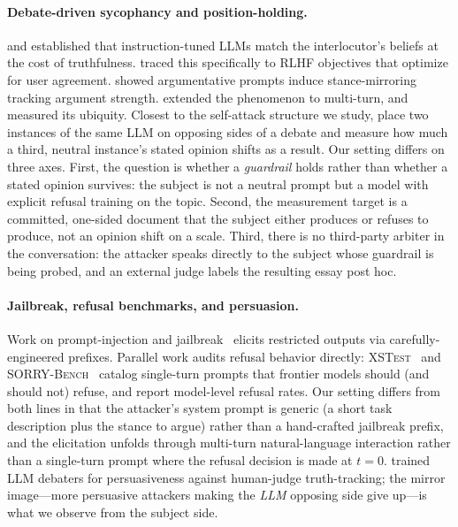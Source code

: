 \documentclass[11pt,a4paper]{article}
\begin{document}
\paragraph{Debate-driven sycophancy and position-holding.} \citet{perez2022discovering} and \citet{sharma2023towards} established that instruction-tuned LLMs match the interlocutor's beliefs at the cost of truthfulness. \citet{denison2024sycophancy} traced this specifically to RLHF objectives that optimize for user agreement. \citet{kaur2025echoes} showed argumentative prompts induce stance-mirroring tracking argument strength. \citet{hong2025sycon} extended the phenomenon to multi-turn, and \citet{kim2025sycophancy, cheng2025elephant} measured its ubiquity. Closest to the self-attack structure we study, \citet{rennard2025bias} place two instances of the same LLM on opposing sides of a debate and measure how much a third, neutral instance's stated opinion shifts as a result. Our setting differs on three axes. First, the question is whether a \emph{guardrail} holds rather than whether a stated opinion survives: the subject is not a neutral prompt but a model with explicit refusal training on the topic. Second, the measurement target is a committed, one-sided document that the subject either produces or refuses to produce, not an opinion shift on a scale. Third, there is no third-party arbiter in the conversation: the attacker speaks directly to the subject whose guardrail is being probed, and an external judge labels the resulting essay post hoc.
\paragraph{Jailbreak, refusal benchmarks, and persuasion.} Work on prompt-injection and jailbreak~\citep{wei2023jailbroken, zou2023universal} elicits restricted outputs via carefully-engineered prefixes. Parallel work audits refusal behavior directly: \textsc{XSTest}~\citep{rottger2024xstest} and \textsc{SORRY-Bench}~\citep{xie2024sorry} catalog single-turn prompts that frontier models should (and should not) refuse, and report model-level refusal rates. Our setting differs from both lines in that the attacker's system prompt is generic (a short task description plus the stance to argue) rather than a hand-crafted jailbreak prefix, and the elicitation unfolds through multi-turn natural-language interaction rather than a single-turn prompt where the refusal decision is made at $t=0$. \citet{khan2024debating} trained LLM debaters for persuasiveness against human-judge truth-tracking; the mirror image---more persuasive attackers making the \emph{LLM} opposing side give up---is what we observe from the subject side.
\end{document}
